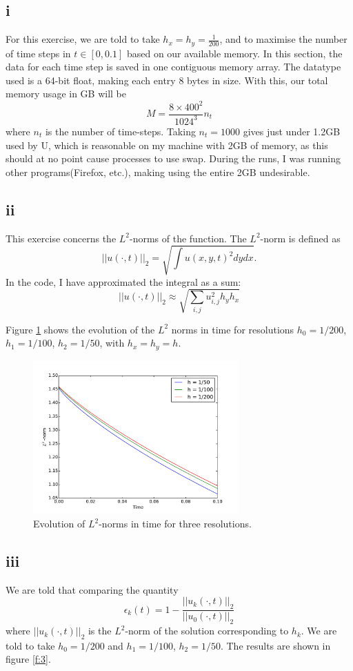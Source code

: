 \documentclass{article}
\begin{document}
\subsection*{i}
For this exercise, we are told to take $h_x = h_y = \frac{1}{200}$, and to maximise the number of
time steps in $t \in [0,0.1]$ based on our available memory. In this section, the data for each
time step is saved in one contiguous memory array. The datatype used is a 64-bit float, making
each entry 8 bytes in size. With this, our total memory usage in GB will be 
$$
  M = \frac{8 \times 400^2}{1024^3}n_t
$$
where $n_t$ is the number of time-steps.
Taking $n_t = 1000$ gives just under 1.2GB used by U, which is reasonable on my machine with 2GB
of memory, as this should at no point cause processes to use swap. During the runs, I was
running other programs(Firefox, etc.), making using the entire 2GB undesirable.

\subsection*{ii}
This exercise concerns the $L^2$-norms of the function. The $L^2$-norm is defined as
$$
  | |u(\cdot,t) | |_2 = \sqrt{\int u(x,y,t)^2 dy dx}.
$$
In the code, I have approximated the integral as a sum:
$$
 | | u(\cdot,t) | |_2 \approx \sqrt{ \sum_{i,j} u_{i,j}^2 h_y h_x }
$$

Figure \ref{f:2} shows the evolution of the $L^2$ norms in time for resolutions
$h_0 = 1/200$, $h_1 = 1/100$, $h_2 = 1/50$, with $h_x = h_y = h$.
\begin{figure}
  \centering
  \includegraphics[width=0.7\textwidth]{2/2/plot.pdf}
  \caption{Evolution of $L^2$-norms in time for three resolutions.}
  \label{f:2}
\end{figure}




\subsection*{iii}
We are told that comparing the quantity
$$
  \epsilon_k(t) = 1 - \frac{ | | u_k (\cdot,t) | |_2  }{| | u_0 (\cdot,t) | |_2 }
$$
where $| | u_k (\cdot,t) | |_2$ is the $L^2$-norm of the solution corresponding to $h_k$.
We are told to take $h_0 = 1/200$ and $h_1 = 1/100$, $h_2 = 1/50$.
The results are shown in figure \ref{f:3}.
\end{document}
